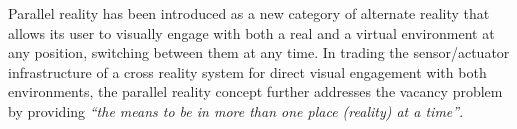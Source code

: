 Parallel reality has been introduced as a new category of alternate reality that allows its user to visually engage with both a real and a virtual environment at any position, switching between them at any time. In trading the sensor/actuator infrastructure of a cross reality system for direct visual engagement with both environments, the parallel reality concept further addresses the vacancy problem by providing \textit{``the means to be in more than one place (reality) at a time''}\cite{Lifton2007a}.